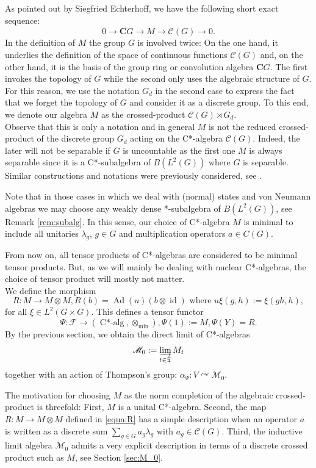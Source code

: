 \documentclass[a4paper,12pt]{amsart}
\numberwithin{equation}{section}
\theoremstyle{definition}
\DeclareMathOperator{\id}{id}
\newcommand{\act}{\curvearrowright}
\newcommand{\al}{\alpha}
\DeclareMathOperator{\Ad}{Ad}
\DeclareMathOperator{\Calg}{C*-alg}
\newcommand{\scrC}{\mathscr C}
\newcommand{\C}{\mathbf C}
\DeclareMathOperator{\dis}{dis}
\newcommand{\cF}{\mathcal F}
\newcommand{\la}{\lambda}
\newcommand{\scrM}{\mathscr M}
\newcommand{\ot}{\otimes}\newcommand{\otmin}{\otimes_{\text{min}}}
\newcommand{\fT}{\mathfrak T}
\begin{document}
As pointed out by Siegfried Echterhoff, we have the following short exact sequence:
$$0\to \overline{\C G}\to M \to \scrC(G) \to 0.$$
{In the definition of $M$ the group $G$ is involved twice: On the one hand, it underlies the definition of the space of continuous functions $\scrC(G)$ and, on the other hand, it is the basis of the group ring or convolution algebra $\C G$. The first invokes the topology of $G$ while the second only uses the algebraic structure of $G$. For this reason, we use the notation $G_d$ in the second case to express the fact that we forget the topology of $G$ and consider it as a discrete group. To this end, we denote our algebra $M$ as the crossed-product $\scrC(G)\rtimes G_d$.\\
Observe that this is only a notation and in general $M$ is not the reduced crossed-product of the discrete group $G_d$ acting on the C*-algebra $\scrC(G)$. Indeed, the later will not be separable if $G$ is uncountable as the first one $M$ is always separable since it is a C*-subalgebra of $B(L^2(G))$ where $G$ is separable.
Similar constructions and notations were previously considered, see \cite{Grundling96}.}

{Note that in those cases in which we deal with (normal) states and von Neumann algebras we may choose any weakly dense *-subalgebra of $B(L^2(G))$, see Remark \ref{rem:subalg}. In this sense, our choice of C*-algebra $M$ is minimal to include all unitaries $\lambda_{g}$, $g\in G$ and multiplication operators $a\in C(G)$.}

From now on, all tensor products of C*-algebras are considered to be minimal tensor products. 
But, as we will mainly be dealing with nuclear C*-algebras, the choice of tensor product will mostly not matter.\\[0.25cm]
We define the morphism 
\begin{equation}\label{equa:R}R:M\to M\ot M, R(b)=\Ad(u)(b\ot \id) \text{ where } u\xi(g,h):=\xi(gh,h) ,\end{equation}
for all $\xi\in L^2(G\times G)$. 
This defines a tensor functor 
$$\Psi:\cF\to (\Calg,\ot_{\min}), \Psi(1):=M, \Psi(Y)=R.$$
By the previous section, we obtain the direct limit of C*-algebras 
$$\scrM_0:=\varinjlim_{t\in\fT} M_t$$ 
together with an action of Thompson's group: $\al_{\Psi}:V\act \scrM_0.$

{The motivation for choosing $M$ as the norm completion of the algebraic crossed-product is threefold: First,
$M$ is a unital C*-algebra. Second, the map $R:M\to M\ot M$ defined in \eqref{equa:R} has a simple description when an operator $a$ is written as a discrete sum $\sum_{g\in G} a_g\la_g$ with $a_g\in\scrC(G)$. Third, the inductive limit algebra $\scrM_0$ admits a very explicit description in terms of a discrete crossed product such as $M$, see Section \ref{sec:M_0}.}
\end{document}
